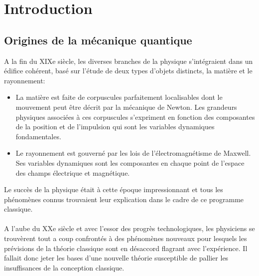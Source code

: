 \chapter*{Introduction}

\section*{Origines de la mécanique quantique}
A la fin du XIXe siècle, les diverses branches de la physique s'intégraient dans un édifice cohérent, basé sur l'étude de deux types d’objets distincts, la matière et le rayonnement:
\begin{itemize}
	\item La matière est faite de corpuscules parfaitement localisables dont le mouvement peut être décrit par la mécanique de Newton. Les grandeurs physiques associées à ces corpuscules s’expriment en fonction des composantes de la position et de l’impulsion qui sont les variables dynamiques fondamentales.
	\item Le rayonnement est gouverné par les lois de l'électromagnétisme de Maxwell. Ses variables dynamiques sont les composantes en chaque point de l’espace des champs électrique et magnétique.
\end{itemize}
Le succès de la physique était à cette époque impressionnant et tous les phénomènes connus trouvaient leur explication dans le cadre de ce programme classique.\\\\

A l’aube du XXe siècle et avec l’essor des progrès technologiques, les physiciens se trouvèrent tout a coup confrontés à des phénomènes nouveaux pour lesquels les prévisions de la théorie classique sont en désaccord flagrant avec l'expérience. Il fallait donc jeter les bases d’une nouvelle théorie susceptible de pallier les insuffisances de la conception classique.

